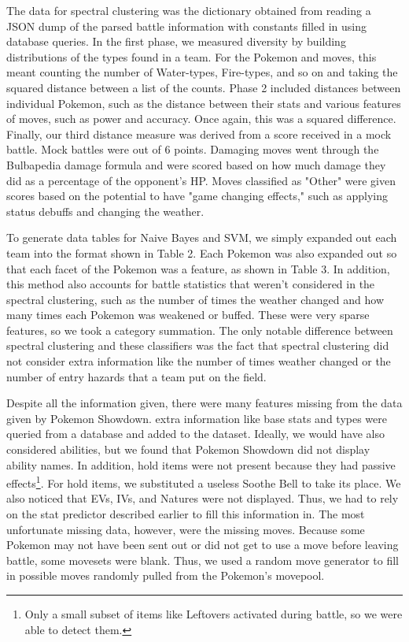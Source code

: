 \documentclass{acm_proc_article-sp}
\begin{document}
The data for spectral clustering was the dictionary obtained from reading a JSON dump of the parsed battle information with constants filled in using database queries. In the first phase, we measured diversity by building distributions of the types found in a team. For the Pokemon and moves, this meant counting the number of Water-types, Fire-types, and so on and taking the squared distance between a list of the counts. Phase 2 included distances between individual Pokemon, such as the distance between their stats and various features of moves, such as power and accuracy. Once again, this was a squared difference. Finally, our third distance measure was derived from a score received in a mock battle. Mock battles were out of 6 points. Damaging moves went through the Bulbapedia damage formula and were scored based on how much damage they did as a percentage of the opponent's HP. Moves classified as "Other" were given scores based on the potential to have "game changing effects," such as applying status debuffs and changing the weather.

To generate data tables for Naive Bayes and SVM, we simply expanded out each team into the format shown in Table 2. Each Pokemon was also expanded out so that each facet of the Pokemon was a feature, as shown in Table 3. In addition, this method also accounts for battle statistics that weren't considered in the spectral clustering, such as the number of times the weather changed and how many times each Pokemon was weakened or buffed. These were very sparse features, so we took a category summation. The only notable difference between spectral clustering and these classifiers was the fact that spectral clustering did not consider extra information like the number of times weather changed or the number of entry hazards that a team put on the field.

Despite all the information given, there were many features missing from the data given by Pokemon Showdown. extra information like base stats and types were queried from a database and added to the dataset. Ideally, we would have also considered abilities, but we found that Pokemon Showdown did not display ability names. In addition, hold items were not present because they had passive effects\footnote{Only a small subset of items like Leftovers activated during battle, so we were able to detect them.}. For hold items, we substituted a useless Soothe Bell to take its place. We also noticed that EVs, IVs, and Natures were not displayed. Thus, we had to rely on the stat predictor described earlier to fill this information in. The most unfortunate missing data, however, were the missing moves. Because some Pokemon may not have been sent out or did not get to use a move before leaving battle, some movesets were blank. Thus, we used a random move generator to fill in possible moves randomly pulled from the Pokemon’s movepool.
\end{document}

